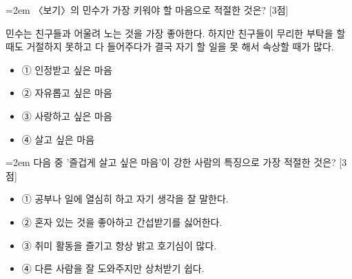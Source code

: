 \documentclass[10pt,a4paper]{article}
\newcommand{\qnum}[1]{%
  \tikz[baseline=(num.base)]{%
    \node[circle, fill=numCircle, text=white, inner sep=0pt,
          minimum size=18pt, font=\small\bfseries] (num) {#1};%
  }%
}
\newcommand{\pts}[1]{%
  \hfill\textcolor{ptsBadge}{[#1점]}%
}
\begin{document}
\vspace{4mm}
\begin{minipage}{\columnwidth}
{\hangindent=2em
\qnum{27}\enspace 〈보기〉의 민수가 가장 키워야 할 마음으로 적절한 것은? \pts{3}
\par}

\vspace{3mm}
\begin{tcolorbox}[bogi]
민수는 친구들과 어울려 노는 것을 가장 좋아한다. 하지만 친구들이 무리한 부탁을 할 때도 거절하지 못하고 다 들어주다가 결국 자기 할 일을 못 해서 속상할 때가 많다.
\end{tcolorbox}
\vspace{3mm}
\begin{itemize}[leftmargin=2.5em, labelsep=0.3em, label={}, itemsep=4pt, parsep=1pt, topsep=0pt]
  \item ① 인정받고 싶은 마음
  \item ② 자유롭고 싶은 마음
  \item ③ 사랑하고 싶은 마음
  \item ④ 살고 싶은 마음
\end{itemize}
\end{minipage}
\vspace{4mm}

\vspace{4mm}
\begin{minipage}{\columnwidth}
{\hangindent=2em
\qnum{28}\enspace 다음 중 '즐겁게 살고 싶은 마음'이 강한 사람의 특징으로 가장 적절한 것은? \pts{3}
\par}

\vspace{3mm}
\begin{itemize}[leftmargin=2.5em, labelsep=0.3em, label={}, itemsep=4pt, parsep=1pt, topsep=0pt]
  \item ① 공부나 일에 열심히 하고 자기 생각을 잘 말한다.
  \item ② 혼자 있는 것을 좋아하고 간섭받기를 싫어한다.
  \item ③ 취미 활동을 즐기고 항상 밝고 호기심이 많다.
  \item ④ 다른 사람을 잘 도와주지만 상처받기 쉽다.
\end{itemize}
\end{minipage}
\vspace{4mm}
\end{document}

